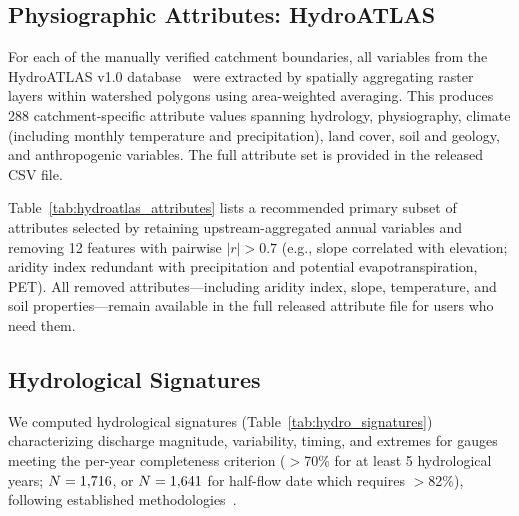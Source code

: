 \subsection{Physiographic Attributes: HydroATLAS}
For each of the \ntotal manually verified catchment boundaries, all variables from the HydroATLAS v1.0 database~\citep{Linke2019} were extracted by spatially aggregating raster layers within watershed polygons using area-weighted averaging.
This produces 288 catchment-specific attribute values spanning hydrology, physiography, climate (including monthly temperature and precipitation), land cover, soil and geology, and anthropogenic variables.
The full attribute set is provided in the released CSV file.

Table~\ref{tab:hydroatlas_attributes} lists a recommended primary subset of \nattributes attributes selected by retaining upstream-aggregated annual variables and removing 12 features with pairwise $|r| > 0.7$ (e.g., slope correlated with elevation; aridity index redundant with precipitation and potential evapotranspiration, PET).
All removed attributes---including aridity index, slope, temperature, and soil properties---remain available in the full released attribute file for users who need them.



\subsection{Hydrological Signatures}
We computed \nsignatures hydrological signatures (Table~\ref{tab:hydro_signatures}) characterizing discharge magnitude, variability, timing, and extremes for gauges meeting the per-year completeness criterion ($>$70\% for at least 5 hydrological years; $N = 1{,}716$, or $N = 1{,}641$ for half-flow date which requires $>$82\%), following established methodologies~\citep{Sawicz2011,McMillan2017}.

